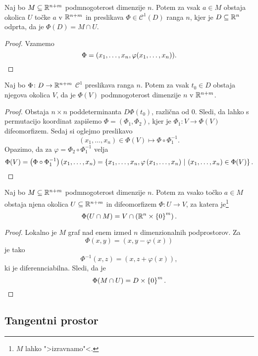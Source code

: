 \begin{trditev}
Naj bo $M \subseteq \mathbb{R}^{n+m}$ podmnogoterost dimenzije $n$. Potem
za vsak $a \in M$ obstaja okolica $U$ točke $a$ v $\mathbb{R}^{n+m}$ in
preslikava $\Phi \in \mathcal{C}^1(D)$ ranga $n$, kjer je
$D \subseteq \mathbb{R}^n$ odprta, da je $\Phi(D) = M \cap U$.
\end{trditev}

\begin{proof}
Vzamemo
\[
\Phi = (x_1, \dots, x_n, \varphi(x_1, \dots, x_n)). \qedhere
\]
\end{proof}

\begin{trditev}
Naj bo $\Phi \colon D \to \mathbb{R}^{n+m}$ $\mathcal{C}^1$ preslikava
ranga $n$. Potem za vsak $t_0 \in D$ obstaja njegova okolica $V$,
da je $\Phi(V)$ podmnogoterost dimenzije $n$ v $\mathbb{R}^{n+m}$.
\end{trditev}

\begin{proof}
Obstaja $n \times n$ poddeterminanta $D\Phi(t_0)$, različna od $0$.
Sledi, da lahko s permutacijo koordinat zapišemo
$\Phi = (\Phi_1, \Phi_2)$, kjer je $\Phi_1 \colon V \to \Phi(V)$
difeomorfizem. Sedaj si oglejmo preslikavo
\[
(x_1, \dots, x_n) \in \Phi(V) \mapsto \Phi \circ \Phi_1^{-1}.
\]
Opazimo, da za $\varphi = \Phi_2 \circ \Phi_1^{-1}$ velja
\[
\Phi(V) =
\left(\Phi \circ \Phi_1^{-1}\right)(x_1, \dots, x_n) =
\left\{x_1, \dots, x_n, \varphi\left(x_1, \dots, x_n\right)~\middle\vert~(x_1, \dots, x_n) \in \Phi(V)\right\}. \qedhere
\]
\end{proof}

\begin{trditev}
Naj bo $M \subseteq \mathbb{R}^{n+m}$ podmnogoterost dimenzije $n$. Potem
za vsako točko $a \in M$ obstaja njena okolica
$U \subseteq \mathbb{R}^{n+m}$ in difeomorfizem $\Phi \colon U \to V$, za
katera je\footnote{$M$ lahko ">izravnamo"<.}
\[
\Phi(U \cap M) = V \cap \left(\mathbb{R}^n \times \left\{0\right\}^m\right).
\]
\end{trditev}

\begin{proof}
Lokalno je $M$ graf nad enem izmed $n$ dimenzionalnih podprostorov.
Za
\[
\Phi(x,y) = (x, y - \varphi(x))
\]
je tako
\[
\Phi^{-1}(x,z) = (x, z + \varphi(x)),
\]
ki je diferennciabilna. Sledi, da je
\[
\Phi(M \cap U) = D \times \left\{0\right\}^m. \qedhere
\]
\end{proof}

\newpage

\subsection{Tangentni prostor}

